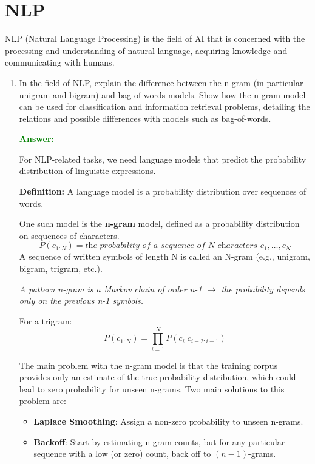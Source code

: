 \documentclass[12pt]{article}
\begin{document}
\section{NLP}
NLP (Natural Language Processing) is the field of AI that is concerned with the processing and understanding of natural language, acquiring knowledge and
communicating with humans.
\begin{enumerate}[label=\textbf{NLP.\arabic*}]

    \item In the field of NLP, explain the difference between the n-gram (in particular unigram and bigram)
          and bag-of-words models.
          Show how the n-gram model can be used for classification and information retrieval problems,
          detailing the relations and possible differences with models such as bag-of-words.

          \textcolor{green}{\textbf{Answer:}}

          For NLP-related tasks, we need language models that predict the probability distribution of linguistic expressions.

          \textbf{Definition:} A language model is a probability distribution over sequences of words.

          One such model is the \textbf{n-gram} model, defined as a probability distribution on sequences of characters.
          \begin{equation}
              P(c_{1:N}) = \textit{the probability of a sequence of N characters } c_1,\ldots,c_N
          \end{equation}
          A sequence of written symbols of length N is called an N-gram (e.g., unigram, bigram, trigram, etc.).
          \begin{center}
              \textit{A pattern n-gram is a Markov chain of order n-1 $\rightarrow$ the probability depends only on the previous n-1 symbols.}
          \end{center}
          For a trigram:
          \begin{equation}
              P(c_{1:N}) = \prod_{i=1}^{N}P(c_i|c_{i-2:i-1})
          \end{equation}

          The main problem with the n-gram model is that the training corpus provides only an estimate of the true probability distribution, which could lead to zero probability for unseen n-grams. Two main solutions to this problem are:
          \begin{itemize}
              \item \textbf{Laplace Smoothing}: Assign a non-zero probability to unseen n-grams.
              \item \textbf{Backoff}: Start by estimating n-gram counts, but for any particular sequence with a low (or zero) count, back off to $(n-1)$-grams.
          \end{itemize}


\end{enumerate}
\end{document}
